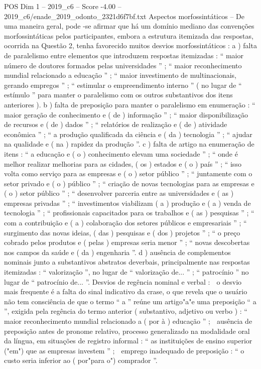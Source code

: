 \begin{textsample}{POS Dim 1 – 2019\_c6 – Score -4.00 – 2019\_c6/enade\_2019\_odonto\_2321d6f7bf.txt}
Aspectos morfossintáticos – De uma maneira geral, pode -se afirmar que há um domínio mediano das convenções morfossintáticas pelos participantes, embora a estrutura itemizada das respostas, ocorrida na Questão 2, tenha favorecido muitos desvios morfossintáticos : a ) falta de paralelismo entre elementos que introduzem respostas itemizadas : “ maior número de doutores formados pelas universidades ” ; “ maior reconhecimento mundial relacionado a educação ” ; “ maior investimento de multinacionais, gerando empregos ” ; “ estimular o empreendimento interno ” ( no lugar de “ estímulo ” para manter o paralelismo com os outros substantivos dos itens anteriores ). b ) falta de preposição para manter o paralelismo em enumeração : “ maior geração de conhecimento e ( de ) informação ” ; “ maior disponibilização de recursos e ( de ) dados ” ; “ relatórios de realização e ( de ) atividade econômica ” ; “ a produção qualificada da ciência e ( da ) tecnologia ” ; “ ajudar na qualidade e ( na ) rapidez da produção ”. c ) falta de artigo na enumeração de itens : “ a educação e ( o ) conhecimento elevam uma sociedade ” ; “ onde é melhor realizar melhorias para as cidades, ( os ) estados e ( o ) país ” ; “ isso volta como serviço para as empresas e ( o ) setor público ” ; “ juntamente com o setor privado e ( o ) público ” ; “ criação de novas tecnologias para as empresas e ( o ) setor público ” ; “ desenvolver parceria entre as universidades e ( as ) empresas privadas ” ; “ investimentos viabilizam ( a ) produção e ( a ) venda de tecnologia ” ; “ profissionais capacitados para os trabalhos e ( as ) pesquisas ” ; “ com a contribuição e ( a ) colaboração dos setores públicos e empresariais ” ; “ surgimento das novas ideias, ( das ) pesquisas e ( dos ) projetos ” ; “ o preço cobrado pelos produtos e ( pelas ) empresas seria menor ” ; “ novas descobertas nos campos da saúde e ( da ) engenharia ”. d ) ausência de complementos nominais junto a substantivos abstratos deverbais, principalmente nas respostas itemizadas : “ valorização ”, no lugar de “ valorização de... ” ; “ patrocínio ” no lugar de “ patrocínio de... ”.
Desvios de regência nominal e verbal :  o desvio mais frequente é a falta do sinal indicativo da crase, o que revela que o usuário não tem consciência de que o termo “ a ” reúne um artigo"a"e uma preposição “ a ”, exigida pela regência do termo anterior ( substantivo, adjetivo ou verbo ) : “ maior reconhecimento mundial relacionado a ( por à ) educação ” ;  ausência de preposição antes de pronome relativo, processo generalizado na modalidade oral da língua, em situações de registro informal : “ as instituições de ensino superior ("em") que as empresas investem ” ;  emprego inadequado de preposição : “ o custo seria inferior ao ( por"para o") comprador ”.

\end{textsample}
